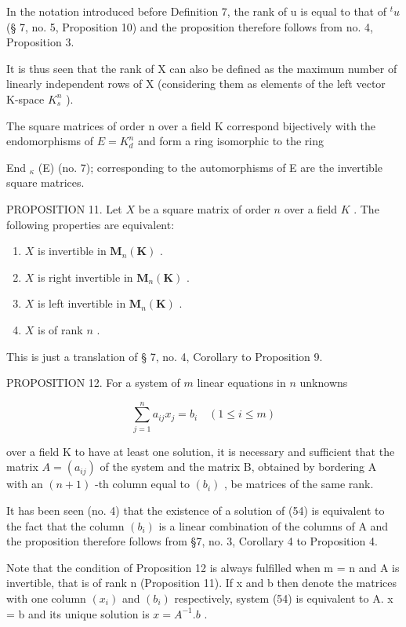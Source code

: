 In the notation introduced before Definition 7, the rank of u is equal to that of \({}^{t}u\) (§ 7, no. 5, Proposition 10) and the proposition therefore follows from no. 4, Proposition 3.

It is thus seen that the rank of X can also be defined as the maximum number of linearly independent rows of X (considering them as elements of the left vector K-space \(K_{s}^{n}\) ).

The square matrices of order n over a field K correspond bijectively with the endomorphisms of \(E = K_{d}^{n}\) and form a ring isomorphic to the ring

End \(_{\kappa}\) (E) (no. 7); corresponding to the automorphisms of E are the invertible square matrices.

PROPOSITION 11. Let \(X\) be a square matrix of order \(n\) over a field \(K\) . The following properties are equivalent:

\begin{enumerate}
\def\labelenumi{(\alph{enumi})}
\item
  \(X\) is invertible in \(\mathbf{M}_n(\mathbf{K})\) .
\item
  \(X\) is right invertible in \(\mathbf{M}_n(\mathbf{K})\) .
\item
  \(X\) is left invertible in \(\mathbf{M}_n(\mathbf{K})\) .
\item
  \(X\) is of rank \(n\) .
\end{enumerate}

This is just a translation of § 7, no. 4, Corollary to Proposition 9.

PROPOSITION 12. For a system of \(m\) linear equations in \(n\) unknowns

\[
\sum_ {j = 1} ^ {n} a _ {i j} x _ {j} = b _ {i} \quad (1 \leqslant i \leqslant m)\tag{54}
\]

over a field K to have at least one solution, it is necessary and sufficient that the matrix \(A = (a_{ij})\) of the system and the matrix B, obtained by bordering A with an \((n + 1)\) -th column equal to \((b_{i})\) , be matrices of the same rank.

It has been seen (no. 4) that the existence of a solution of (54) is equivalent to the fact that the column \((b_{i})\) is a linear combination of the columns of A and the proposition therefore follows from §7, no. 3, Corollary 4 to Proposition 4.

Note that the condition of Proposition 12 is always fulfilled when m = n and A is invertible, that is of rank n (Proposition 11). If x and b then denote the matrices with one column \((x_{i})\) and \((b_{i})\) respectively, system (54) is equivalent to A. x = b and its unique solution is \(x = A^{-1}.b\) .

